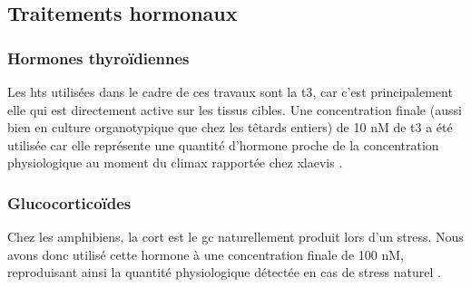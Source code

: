 \documentclass[../main.tex]{subfiles}
\begin{document}

	\subsection{Traitements hormonaux}

		\subsubsection{Hormones thyroïdiennes}
			Les \glspl{ht} utilisées dans le cadre de ces travaux sont la \gls{t3}, car c'est principalement elle qui est directement active sur les tissus cibles.
			Une concentration finale (aussi bien en culture organotypique que chez les têtards entiers) de 10 nM de \gls{t3} a été utilisée car elle représente une quantité d'hormone proche de la concentration physiologique au moment du climax rapportée chez \gls{xlaevis} \citep{Leloup1977}.

		\subsubsection{Glucocorticoïdes}
			Chez les amphibiens, la \gls{cort} est le \gls{gc} naturellement produit lors d'un stress.
			Nous avons donc utilisé cette hormone à une concentration finale de 100 nM, reproduisant ainsi la quantité physiologique détectée en cas de stress naturel \citep{JolivetJaudet1984,Krain2004}.
\end{document}
